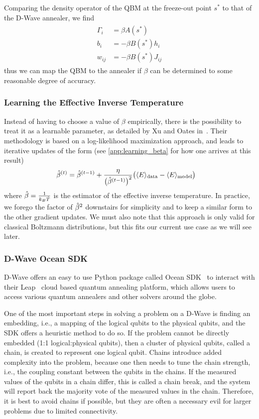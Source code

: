 Comparing the density operator of the QBM at the freeze-out point \( s^* \) to that of the D-Wave annealer, we find
\begin{align}
\begin{split}
    \Gamma_i
        &= \beta A(s^*) \\
    b_i
        &= -\beta B(s^*) h_i \\
    w_{ij}
        &= -\beta B(s^*) J_{ij}
    \label{eq:qbm_scaling}
\end{split}
\end{align}
thus we can map the QBM to the annealer if \( \beta \) can be determined to some reasonable degree of accuracy.

\subsubsection{Learning the Effective Inverse Temperature}\label{sec:learning_beta}
Instead of having to choose a value of \( \beta \) empirically, there is the possibility to treat it as a learnable parameter, as detailed by Xu and Oates in~\cite{xu_2021}.
Their methodology is based on a log-likelihood maximization approach, and leads to iterative updates of the form (see \cref{app:learning_beta} for how one arrives at this result)
\begin{align}
    \hat{\beta}^{(t)}
        &= \hat{\beta}^{(t-1)} + \frac{\eta}{\big(\hat{\beta}^{(t-1)}\big)^2}\big(\langle E \rangle_\text{data} - \langle E \rangle_\text{model}\big)
\end{align}
where \( \hat{\beta} = \frac{1}{k_B\hat{T}} \) is the estimator of the effective inverse temperature.
In practice, we forego the factor of \( \hat{\beta}^2 \) downstairs for simplicity and to keep a similar form to the other gradient updates.
We must also note that this approach is only valid for classical Boltzmann distributions, but this fits our current use case as we will see later.

\subsubsection{D-Wave Ocean SDK}
D-Wave offers an easy to use Python package called Ocean SDK~\cite{dwave_ocean} to interact with their Leap~\cite{dwave_leap} cloud based quantum annealing platform, which allows users to access various quantum annealers and other solvers around the globe.

One of the most important steps in solving a problem on a D-Wave is finding an embedding, i.e., a mapping of the logical qubits to the physical qubits, and the SDK offers a heuristic method to do so.
If the problem cannot be directly embedded (1:1 logical:physical qubits), then a cluster of physical qubits, called a chain, is created to represent one logical qubit.
Chains introduce added complexity into the problem, because one then needs to tune the chain strength, i.e., the coupling constant between the qubits in the chains.
If the measured values of the qubits in a chain differ, this is called a chain break, and the system will report back the majority vote of the measured values in the chain.
Therefore, it is best to avoid chains if possible, but they are often a necessary evil for larger problems due to limited connectivity.

